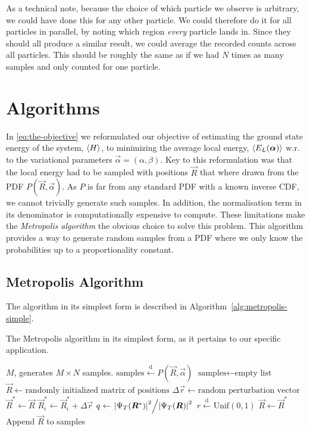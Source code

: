\documentclass[twocolumn]{article}
\newcommand{\setfrom}{\overset{\mathrm{d}}{\leftarrow}}
\begin{document}
As a technical note, because the choice of which particle we observe is
arbitrary, we could have done this for any other particle. We could therefore do
it for all particles in parallel, by noting which region \textit{every} particle
lands in. Since they should all produce a similar result, we could average the
recorded counts across all particles. This should be roughly the same as if we
had $N$ times as many samples and only counted for one particle.


\section{Algorithms}
In \eqref{eq:the-objective} we reformulated our objective of estimating the ground state energy of the
system, $\expval{H}$, to minimizing the average local energy, $\expval{E_L(\bm\alpha)}$ w.r. to
the variational parameters $\vec \alpha = (\alpha, \beta)$. Key to this
reformulation was that the local energy had to be sampled with positions $\vec
R$ that where drawn from the PDF $P(\vec R, \vec\alpha)$. As $P$ is far from any
standard PDF with a known inverse CDF, we cannot trivially generate such
samples. In addition, the normalisation term in its denominator is
computationally expensive to compute. These limitations make the
\textit{Metropolis algorithm} the obvious choice to solve this problem. This
algorithm provides a way to generate random samples from a PDF where we only
know the probabilities up to a proportionality constant.

\subsection{Metropolis Algorithm}
The algorithm in its
simplest form is described in Algorithm~\ref{alg:metropolis-simple}.

\begin{algorithm}[H]
    \caption{The Metropolis algorithm in its simplest form, as it
    pertains to our specific application.}
    \label{alg:metropolis-simple}
    \begin{algorithmic}[1]
        \REQUIRE $M$, generates $M\times N$ samples.
        \ENSURE $\text{samples} \setfrom P(\vec R, \vec\alpha)$
        \STATE $\text{samples} \leftarrow \text{empty list}$
        \STATE $\vec R \leftarrow \text{randomly initialized matrix of positions}$
                \STATE $\Delta \vec{r} \leftarrow \text{random perturbation vector}$
                \STATE $\vec R^*\leftarrow \vec R $
                \STATE $\vec R^*_i \leftarrow \vec R^{*}_i+ \Delta \vec{r}$ 
                \STATE $q \leftarrow \flatfrac{\abs{\Psi_T(\vec R^*)}^2}{\abs{\Psi_T(\vec R)}^2}$
                \STATE $r \setfrom \text{Unif}(0, 1)$
                    \STATE $\vec R \leftarrow \vec R^*$
                \ENDIF
                \STATE Append $\vec R$ to samples
            \ENDFOR
        \ENDFOR
    \end{algorithmic}
\end{algorithm}
\end{document}
